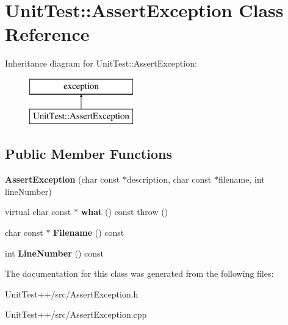 \hypertarget{classUnitTest_1_1AssertException}{\section{Unit\-Test\-:\-:Assert\-Exception Class Reference}
\label{classUnitTest_1_1AssertException}
}
Inheritance diagram for Unit\-Test\-:\-:Assert\-Exception\-:\begin{figure}[H]
\begin{center}
\leavevmode
\includegraphics[height=2.000000cm]{classUnitTest_1_1AssertException}
\end{center}
\end{figure}
\subsection*{Public Member Functions}
\begin{DoxyCompactItemize}
\item 
\hypertarget{classUnitTest_1_1AssertException_a3fde2eb7e5dd69ebbcb3bd781ab4221a}{{\bfseries Assert\-Exception} (char const $\ast$description, char const $\ast$filename, int line\-Number)}\label{classUnitTest_1_1AssertException_a3fde2eb7e5dd69ebbcb3bd781ab4221a}

\item 
\hypertarget{classUnitTest_1_1AssertException_a321b8f31ccebd13f1f9824bf294659e4}{virtual char const $\ast$ {\bfseries what} () const   throw ()}\label{classUnitTest_1_1AssertException_a321b8f31ccebd13f1f9824bf294659e4}

\item 
\hypertarget{classUnitTest_1_1AssertException_af0a039a7db8caf2a8ef0d2011814ed7e}{char const $\ast$ {\bfseries Filename} () const }\label{classUnitTest_1_1AssertException_af0a039a7db8caf2a8ef0d2011814ed7e}

\item 
\hypertarget{classUnitTest_1_1AssertException_af94e4817bb3ee0af0f53520738a08545}{int {\bfseries Line\-Number} () const }\label{classUnitTest_1_1AssertException_af94e4817bb3ee0af0f53520738a08545}

\end{DoxyCompactItemize}


The documentation for this class was generated from the following files\-:\begin{DoxyCompactItemize}
\item 
Unit\-Test++/src/Assert\-Exception.\-h\item 
Unit\-Test++/src/Assert\-Exception.\-cpp\end{DoxyCompactItemize}
